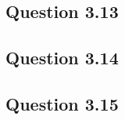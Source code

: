 \documentclass{article}
\begin{document}
\subsection{Question 3.13}\label{appendix:code.3.13}


\subsection{Question 3.14}\label{appendix:code.3.14}


\subsection{Question 3.15}\label{appendix:code.3.15}

\end{document}
